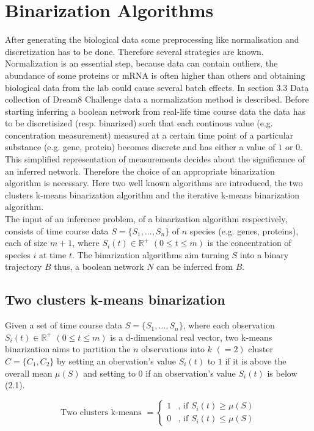 \section{Binarization Algorithms}
After generating the biological data some preprocessing like normalisation and discretization has to be done. Therefore several strategies are known. Normalization is an essential step, because data can contain outliers, the abundance of some proteins or mRNA is often higher than others and obtaining biological data from the lab could cause several batch effects. In section 3.3 Data collection of Dream8 Challenge data a normalization method is described.
Before starting inferring a boolean network from real-life time course data the data has to be discretisized (resp. binarized) such that each continous value (e.g. concentration measurement) measured at a certain time point of a particular substance (e.g. gene, protein) becomes discrete and has either a value of $1$ or $0$. This simplified representation of measurements decides about the significance of an inferred network. Therefore the choice of an appropriate binarization algorithm is necessary. Here two well known algorithms are introduced, the two clusters k-means binarization algorithm and the iterative k-means binarization algorithm.\\
The input of an inference problem, of a binarization algorithm respectively, consists of time course data $S=\{S_{1}, ...,S_{n}\}$ of $n$ species (e.g. genes, proteins), each of size $m+1$, where $S_{i}(t)\in\mathbb{R^{+}}$ $(0\le t \le m)$ is the concentration of species $i$ at time $t$. The binarization algorithms aim turning $S$ into a binary trajectory $B$ thus, a boolean network $N$ can be inferred from $B$.

\subsection*{Two clusters k-means binarization}
Given a set of time course data $S=\{S_{1}, ...,S_{n}\}$, where each observation $S_{i}(t)\in\mathbb{R^{+}}$ $(0\le t \le m)$ is a d-dimensional real vector, two k-means binarization aims to partition the $n$ observations into $k$ $(=2)$ cluster $C=\{C_{1},C_{2}\}$ by setting an obervation's value $S_{i}(t)$ to $1$ if it is above the overall mean $\mu(S)$ and setting to $0$ if an observation's value $S_{i}(t)$ is below (2.1).

\begin{equation}
\text{Two clusters k-means }=\begin{cases}
1 & \text{, if }S_{i}(t)\ge \mu (S)\\
0 & \text{, if }S_{i}(t)\le \mu (S)
\end{cases}
\end{equation}

